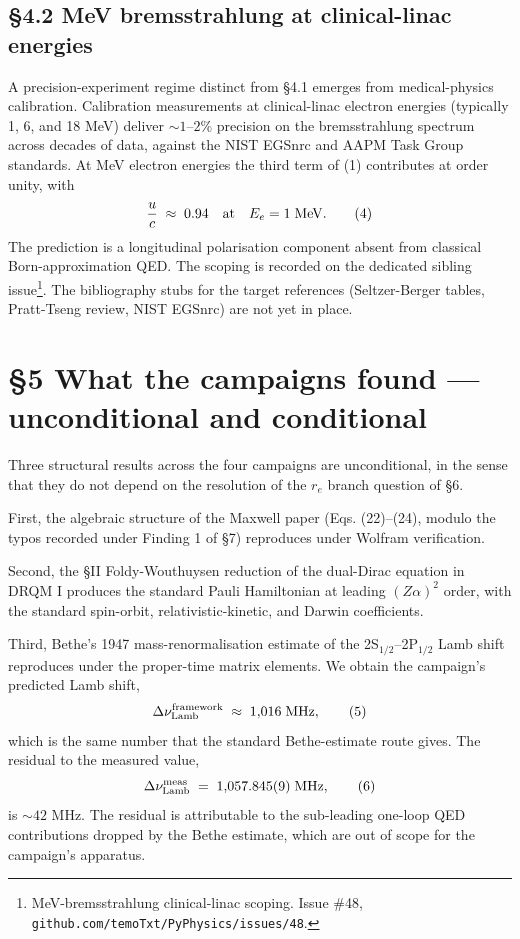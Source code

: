 \documentclass[
  11pt,
]{article}
\begin{document}
\hypertarget{mev-bremsstrahlung-at-clinical-linac-energies}{%
\subsection{§4.2 MeV bremsstrahlung at clinical-linac
energies}\label{mev-bremsstrahlung-at-clinical-linac-energies}}

A precision-experiment regime distinct from §4.1 emerges from
medical-physics calibration. Calibration measurements at clinical-linac
electron energies (typically 1, 6, and 18 MeV) deliver
\(\sim 1\)--\(2\%\) precision on the bremsstrahlung spectrum across
decades of data, against the NIST EGSnrc and AAPM Task Group standards.
At MeV electron energies the third term of (1) contributes at order
unity, with \[
\frac{u}{c} \;\approx\; 0.94 \quad\text{at}\quad E_{e} = 1\;{\rm MeV}.
\tag{4}
\] The prediction is a longitudinal polarisation component absent from
classical Born-approximation QED. The scoping is recorded on the
dedicated sibling issue\footnote{MeV-bremsstrahlung clinical-linac
  scoping. Issue \#48, \texttt{github.com/temoTxt/PyPhysics/issues/48}.}.
The bibliography stubs for the target references (Seltzer-Berger tables,
Pratt-Tseng review, NIST EGSnrc) are not yet in place.

\hypertarget{what-the-campaigns-found-unconditional-and-conditional}{%
\section{§5 What the campaigns found --- unconditional and
conditional}\label{what-the-campaigns-found-unconditional-and-conditional}}

Three structural results across the four campaigns are unconditional, in
the sense that they do not depend on the resolution of the \(r_{e}\)
branch question of §6.

First, the algebraic structure of the Maxwell paper (Eqs. (22)--(24),
modulo the typos recorded under Finding 1 of §7) reproduces under
Wolfram verification.

Second, the §II Foldy-Wouthuysen reduction of the dual-Dirac equation in
DRQM I produces the standard Pauli Hamiltonian at leading
\((Z\alpha)^{2}\) order, with the standard spin-orbit,
relativistic-kinetic, and Darwin coefficients.

Third, Bethe's 1947 mass-renormalisation estimate of the
2S\(_{1/2}\)--2P\(_{1/2}\) Lamb shift reproduces under the proper-time
matrix elements. We obtain the campaign's predicted Lamb shift, \[
\Delta\nu_{\rm Lamb}^{\rm framework}
\;\approx\; 1{,}016\;{\rm MHz},
\tag{5}
\] which is the same number that the standard Bethe-estimate route
gives. The residual to the measured value, \[
\Delta\nu_{\rm Lamb}^{\rm meas} \;=\; 1{,}057.845(9)\;{\rm MHz},
\tag{6}
\] is \(\sim 42\) MHz. The residual is attributable to the sub-leading
one-loop QED contributions dropped by the Bethe estimate, which are out
of scope for the campaign's apparatus.
\end{document}
